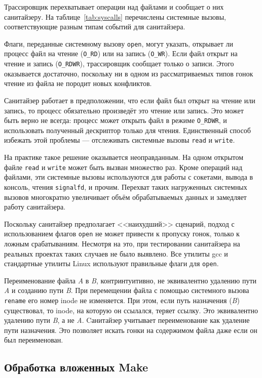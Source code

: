 Трассировщик перехватывает операции над файлами и сообщает о них санитайзеру. На таблице~\ref{tab:syscalls} перечислены системные вызовы, соответствующие разным типам событий для санитайзера.

Флаги, переданные системному вызову \texttt{open}, могут указать, открывает ли процесс файл на чтение (\texttt{O\_RD}) или на запись (\texttt{O\_WR}). Если файл открыт на чтение и запись (\texttt{O\_RDWR}), трассировщик сообщает только о записи. Этого оказывается достаточно, поскольку ни в одном из рассматриваемых типов гонок чтение из файла не породит новых конфликтов.

Санитайзер работает в предположении, что если файл был открыт на чтение или запись, то процесс обязательно произведёт это чтение или запись. Это может быть верно не всегда: процесс может открыть файл в режиме \texttt{O\_RDWR}, и использовать полученный дескриптор только для чтения. Единственный способ избежать этой проблемы --- отслеживать системные вызовы \texttt{read} и \texttt{write}.

На практике такое решение оказывается неоправданным. На одном открытом файле \texttt{read} и \texttt{write} может быть вызван множество раз. Кроме операций над файлами, эти системные вызовы используются для работы с сокетами, вывода в консоль, чтения \texttt{signalfd}, и прочим. Перехват таких нагруженных системных вызовов многократно увеличивает объём обрабатываемых данных и замедляет работу санитайзера.

Поскольку санитайзер предполагает <<наихудший>> сценарий, подход с использованием флагов \texttt{open} не может привести к пропуску гонок, только к ложным срабатываниям. Несмотря на это, при тестировании санитайзера на реальных проектах таких случаев не было выявлено. Все утилиты gcc и стандартные утилиты Linux используют правильные флаги для \texttt{open}.

Переименование файла \textit{A} в \textit{B}, контринтуитивно, не эквивалентно удалению пути \textit{A} и созданию пути \textit{B}. При перемещении файла с помощью системного вызова \texttt{rename} его номер inode не изменяется. При этом, если путь назначения (\textit{B}) существовал, то inode, на которую он ссылался, теряет ссылку. Это эквивалентно удалению пути \textit{B}, а не \textit{A}. Cанитайзер учитывает переименование как удаление пути назначения. Это позволяет искать гонки на содержимом файла даже если он был переименован.

\subsection{Обработка вложенных Make}
\label{subsec:nested-make}


